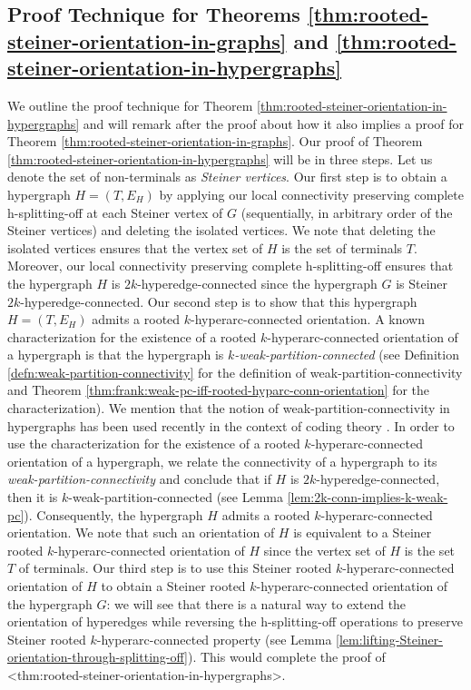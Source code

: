 \documentclass{article}
\def\Cref#1{<#1>}%
\begin{document}
\subsection{Proof Technique for Theorems \ref{thm:rooted-steiner-orientation-in-graphs} and \ref{thm:rooted-steiner-orientation-in-hypergraphs}}
We outline the proof technique for Theorem \ref{thm:rooted-steiner-orientation-in-hypergraphs} and will remark after the proof about how it also implies a proof for Theorem \ref{thm:rooted-steiner-orientation-in-graphs}. 
Our proof of Theorem \ref{thm:rooted-steiner-orientation-in-hypergraphs} will be in three steps. 
Let us denote the set of non-terminals as \emph{Steiner vertices}. 
Our first step is to obtain a hypergraph $H = (T, E_H)$ by applying our local connectivity preserving complete h-splitting-off at each Steiner vertex of $G$ (sequentially, in arbitrary order of the Steiner vertices) and deleting the isolated  vertices. 
We note that deleting the isolated vertices ensures that the vertex set of $H$ is the set of terminals $T$. 
Moreover, our local connectivity preserving complete h-splitting-off ensures that the hypergraph $H$ is $2k$-hyperedge-connected since the hypergraph $G$ is Steiner $2k$-hyperedge-connected. 
Our second step is to show that this hypergraph $H=(T, E_H)$ admits a rooted $k$-hyperarc-connected orientation. 
A known characterization for the existence of a rooted $k$-hyperarc-connected orientation of a hypergraph is that the hypergraph is \emph{$k$-weak-partition-connected} (see Definition \ref{defn:weak-partition-connectivity} for the definition of weak-partition-connectivity and Theorem \ref{thm:frank:weak-pc-iff-rooted-hyparc-conn-orientation} for the characterization). We mention that the notion of weak-partition-connectivity in hypergraphs has been used recently in the  context of coding theory \cite{GLSTW22, AGL23}. 
In order to use the characterization for the existence of a rooted $k$-hyperarc-connected orientation of a hypergraph, we relate the connectivity of a hypergraph to its \emph{weak-partition-connectivity} and conclude that if $H$ is $2k$-hyperedge-connected, then it is $k$-weak-partition-connected (see Lemma \ref{lem:2k-conn-implies-k-weak-pc}). 
Consequently, the hypergraph $H$ admits a rooted $k$-hyperarc-connected orientation. 
We note that such an orientation of $H$ is equivalent to a Steiner rooted $k$-hyperarc-connected orientation of $H$ since the vertex set of $H$ is the set $T$ of terminals. 
Our third step is to use this Steiner rooted $k$-hyperarc-connected orientation of $H$ to obtain a Steiner rooted $k$-hyperarc-connected orientation of the hypergraph $G$: we will see that there is a natural way to extend the orientation of hyperedges while reversing the h-splitting-off operations to preserve Steiner rooted $k$-hyperarc-connected property (see Lemma \ref{lem:lifting-Steiner-orientation-through-splitting-off}). This would complete the proof of \Cref{thm:rooted-steiner-orientation-in-hypergraphs}. 
\end{document}
